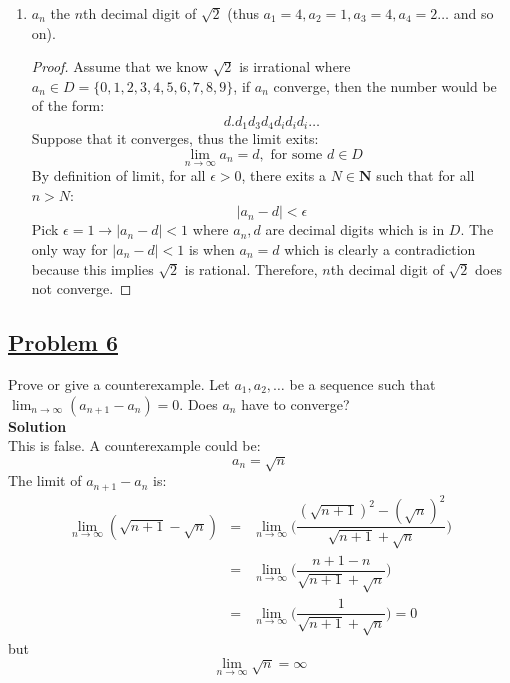 \documentclass[10pt,letterpaper]{article}
\newcommand{\sol}{\textbf{Solution}}
\begin{document}
\begin{enumerate}[label=(\roman{*})]
		\item $a_n$ the $n$th decimal digit of $\sqrt{2}$ (thus $a_1 = 4, a_2 = 1, a_3 = 4, a_4 = 2 \ldots$ and so on).
		\begin{proof}
			Assume that we know $\sqrt{2}$ is irrational where $a_n \in D = \{0, 1, 2, 3, 4, 5, 6, 7, 8, 9\}$, if 
			$a_n$ converge, then the number would be of the form:
			$$d.d_1d_3d_4d_id_id_i \ldots$$
			Suppose that it converges, thus the limit exits:
			$$\displaystyle\lim_{n\to\infty}a_n = d, \text{ for some } d \in D$$
			By definition of limit, for all $\epsilon > 0$, there exits a $N \in \mathbf{N}$ such that
			for all $n > N$:
				$$|a_n - d| < \epsilon$$
			Pick $\epsilon = 1 \rightarrow |a_n - d| < 1$ where $a_n, d$ are decimal digits which is in $D$.
			The only way for $|a_n - d| < 1$ is when $a_n = d$ which is clearly a contradiction because this implies
			$\sqrt{2}$ is rational. Therefore, $n$th decimal digit of $\sqrt{2}$ does not converge.
					
		\end{proof}
	\end{enumerate}
	
	\subsection*{{\color{red}\underline{Problem 6}}}
	Prove or give a counterexample. Let $a_1, a_2, \ldots$ be a sequence such that 
	$\displaystyle\lim_{n\to \infty}(a_{n+1} - a_n) = 0$. Does $a_n$ have to converge? \\
	\sol \\
	This is false. A counterexample could be:
			$$a_n = \sqrt{n}$$
		The limit of $a_{n+1} - a_{n}$ is:
		\begin{eqnarray*}
			\displaystyle\lim_{n\to \infty} (\sqrt{n+1} - \sqrt{n})
			&=& \displaystyle\lim_{n\to \infty} 
			\bigg(\dfrac{(\sqrt{n+1})^2 - (\sqrt{n})^2}{\sqrt{n+1} + \sqrt{n}}\bigg) \\
			&=& \displaystyle\lim_{n\to \infty} 
			\bigg(\dfrac{n + 1 - n}{\sqrt{n+1} + \sqrt{n}}\bigg) \\
			&=& \displaystyle\lim_{n\to \infty} 
			\bigg(\dfrac{1}{\sqrt{n+1} + \sqrt{n}}\bigg) = 0
		\end{eqnarray*}
		but $$ \displaystyle\lim_{n\to \infty} \sqrt{n} = \infty$$
	
\end{document}
